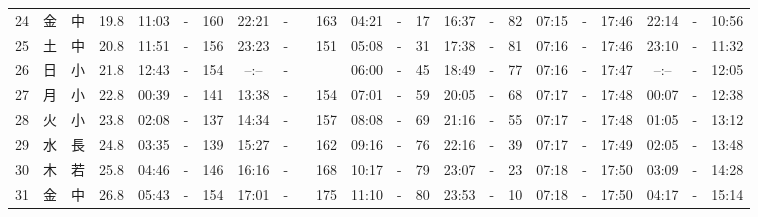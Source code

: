 \documentclass[12pt,a4j]{jsarticle}
\begin{document}
\begin{table}[htbp]
\begin{center}
{\begin{tabular}{|rc|cr|ccrccr|ccrccr|ccc|ccc|}
24 & 金 & 中 & 19.8 &  11:03 &-& 160 &  22:21 &-& 163 &  04:21 &-&  17 &  16:37 &-&  82 & 07:15 & -& 17:46 & 22:14 & -& 10:56 \\
25 & 土 & 中 & 20.8 &  11:51 &-& 156 &  23:23 &-& 151 &  05:08 &-&  31 &  17:38 &-&  81 & 07:16 & -& 17:46 & 23:10 & -& 11:32 \\
26 & 日 & 小 & 21.8 &  12:43 &-& 154 &  --:-- &-&~~~~~ &  06:00 &-&  45 &  18:49 &-&  77 & 07:16 & -& 17:47 & --:-- & -& 12:05 \\
27 & 月 & 小 & 22.8 &  00:39 &-& 141 &  13:38 &-& 154 &  07:01 &-&  59 &  20:05 &-&  68 & 07:17 & -& 17:48 & 00:07 & -& 12:38 \\
28 & 火 & 小 & 23.8 &  02:08 &-& 137 &  14:34 &-& 157 &  08:08 &-&  69 &  21:16 &-&  55 & 07:17 & -& 17:48 & 01:05 & -& 13:12 \\
29 & 水 & 長 & 24.8 &  03:35 &-& 139 &  15:27 &-& 162 &  09:16 &-&  76 &  22:16 &-&  39 & 07:17 & -& 17:49 & 02:05 & -& 13:48 \\
30 & 木 & 若 & 25.8 &  04:46 &-& 146 &  16:16 &-& 168 &  10:17 &-&  79 &  23:07 &-&  23 & 07:18 & -& 17:50 & 03:09 & -& 14:28 \\
31 & 金 & 中 & 26.8 &  05:43 &-& 154 &  17:01 &-& 175 &  11:10 &-&  80 &  23:53 &-&  10 & 07:18 & -& 17:50 & 04:17 & -& 15:14 \\
   \hline
   \end{tabular}}
   \end{center}
\end{table}
\newpage
\end{document}
